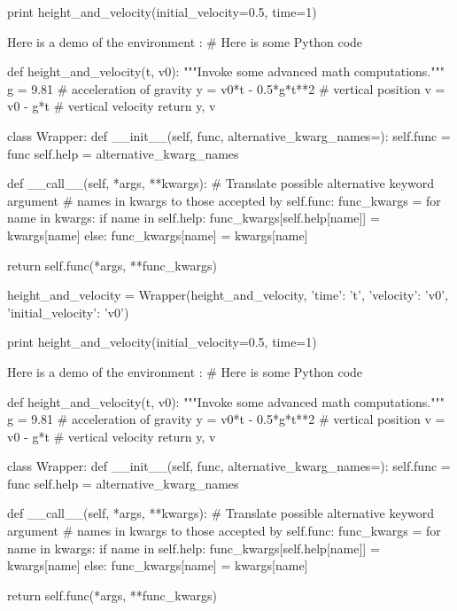 print height_and_velocity(initial_velocity=0.5, time=1)


\noindent
Here is a demo of the environment :
# Here is some Python code

def height_and_velocity(t, v0):
    """Invoke some advanced math computations."""
    g = 9.81                  # acceleration of gravity
    y = v0*t - 0.5*g*t**2     # vertical position
    v = v0 - g*t              # vertical velocity
    return y, v

class Wrapper:
    def __init__(self, func, alternative_kwarg_names={}):
        self.func = func
        self.help = alternative_kwarg_names

    def __call__(self, *args, **kwargs):
        # Translate possible alternative keyword argument
        # names in kwargs to those accepted by self.func:
        func_kwargs = {}
        for name in kwargs:
            if name in self.help:
                func_kwargs[self.help[name]] = kwargs[name]
            else:
                func_kwargs[name] = kwargs[name]

        return self.func(*args, **func_kwargs)

height_and_velocity = Wrapper(height_and_velocity,
                              {'time': 't',
                               'velocity': 'v0',
                               'initial_velocity': 'v0'})

print height_and_velocity(initial_velocity=0.5, time=1)


\noindent
Here is a demo of the environment :
# Here is some Python code

def height_and_velocity(t, v0):
    """Invoke some advanced math computations."""
    g = 9.81                  # acceleration of gravity
    y = v0*t - 0.5*g*t**2     # vertical position
    v = v0 - g*t              # vertical velocity
    return y, v

class Wrapper:
    def __init__(self, func, alternative_kwarg_names={}):
        self.func = func
        self.help = alternative_kwarg_names

    def __call__(self, *args, **kwargs):
        # Translate possible alternative keyword argument
        # names in kwargs to those accepted by self.func:
        func_kwargs = {}
        for name in kwargs:
            if name in self.help:
                func_kwargs[self.help[name]] = kwargs[name]
            else:
                func_kwargs[name] = kwargs[name]

        return self.func(*args, **func_kwargs)

